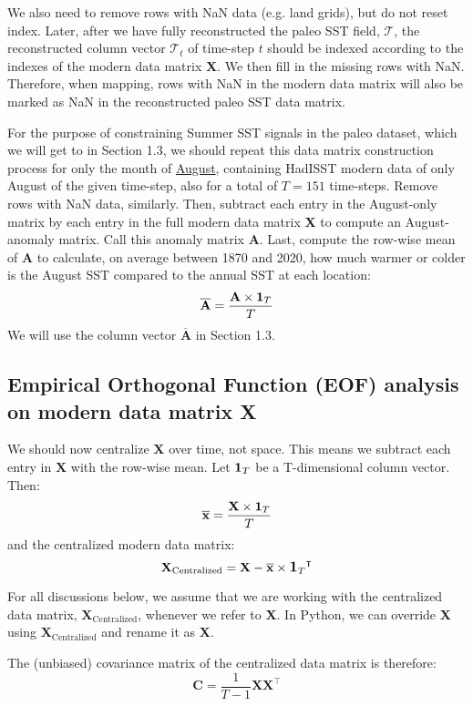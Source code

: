 \documentclass{article}
\begin{document}
We also need to remove rows with NaN data (e.g. land grids), but do not reset index. Later, after we have fully reconstructed the paleo SST field, $\mathcal{T}$, the reconstructed column vector $\mathcal{T}_t$ of time-step $t$ should be indexed according to the indexes of the modern data matrix \textbf{X}. We then fill in the missing rows with NaN. Therefore, when mapping, rows with NaN in the modern data matrix will also be marked as NaN in the reconstructed paleo SST data matrix.

For the purpose of constraining Summer SST signals in the paleo dataset, which we will get to in Section 1.3, we should repeat this data matrix construction process for only the month of \ul{August}, containing HadISST modern data of only August of the given time-step, also for a total of $T=151$ time-steps. Remove rows with NaN data, similarly. Then, subtract each entry in the August-only matrix by each entry in the full modern data matrix \textbf{X} to compute an August-anomaly matrix. Call this anomaly matrix \textbf{A}. Last, compute the row-wise mean of \textbf{A} to calculate, on average between 1870 and 2020, how much warmer or colder is the August SST compared to the annual SST at each location:
$$\overline{\textbf{A}} = \frac{\textbf{A} \times \mathlarger{\mathbf{1}}_{T}}{T}$$
We will use the column vector $\overline{\textbf{A}}$ in Section 1.3.

\subsection{Empirical Orthogonal Function (EOF) analysis on modern data matrix \textbf{X}}

We should now centralize $\textbf{X}$ over time, not space. This means we subtract each entry in $\textbf{X}$ with the row-wise mean. Let $\mathlarger{\mathbf{1}}_{T}$ be a T-dimensional column vector. Then:
$$\overline{\textbf{x}} = \frac{\textbf{X} \times \mathlarger{\mathbf{1}}_{T}}{T}$$
and the centralized modern data matrix:
$$\textbf{X}_{\text{Centralized}} = \textbf{X} - \overline{\textbf{x}} \times {\mathlarger{\mathbf{1}}_{T}}^\intercal$$

For all discussions below, we assume that we are working with the centralized data matrix, $\textbf{X}_{\text{Centralized}}$, whenever we refer to \textbf{X}. In Python, we can override \textbf{X} using $\textbf{X}_{\text{Centralized}}$ and rename it as \textbf{X}.

The (unbiased) covariance matrix of the centralized data matrix is therefore:
$$\textbf{C} = \frac{1}{T-1} \textbf{X} \textbf{X}^\intercal$$
\end{document}

